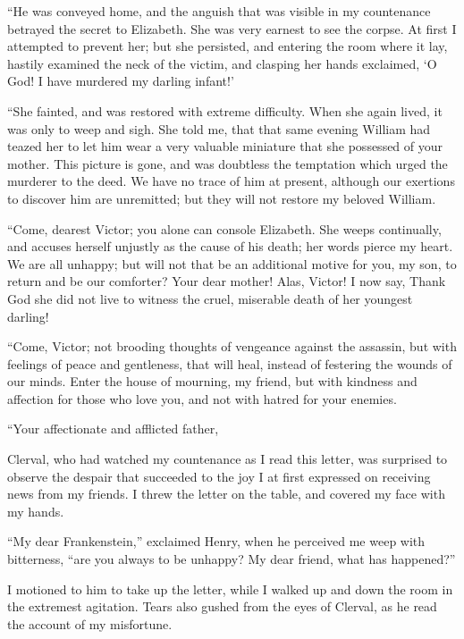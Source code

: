 ``He was conveyed home, and the
anguish that was visible in my countenance
betrayed the secret to Elizabeth.
She was very earnest to see the corpse.
At first I attempted to prevent her; but
she persisted, and entering the room
where it lay, hastily examined the neck
of the victim, and clasping her hands
exclaimed, `O God! I have murdered
my darling infant!'

``She fainted, and was restored with
extreme difficulty. When she again
lived, it was only to weep and sigh.
She told me, that that same evening
William had teazed her to let him wear
a very valuable miniature that she possessed
of your mother. This picture is
gone, and was doubtless the temptation
which urged the murderer to the deed.
We have no trace of him at present,
although our exertions to discover him
are unremitted; but they will not restore
my beloved William.

``Come, dearest Victor; you alone
can console Elizabeth. She weeps continually,
and accuses herself unjustly as
the cause of his death; her words pierce
my heart. We are all unhappy; but
will not that be an additional motive
for you, my son, to return and be our
comforter? Your dear mother! Alas,
Victor! I now say, Thank God she did
not live to witness the cruel, miserable
death of her youngest darling!

``Come, Victor; not brooding thoughts
of veng\-eance ag\-ainst the assassin, but
with feelings of peace and gentleness,
that will heal, instead of festering the
wounds of our minds. Enter the house
of mourning, my friend, but with kindness
and affection for those who love
you, and not with hatred for your enemies.

``Your affectionate and afflicted father,

Clerval, who had watched my countenance
as I read this letter, was surprised
to observe the despair that succeeded
to the joy I at first expressed
on receiving news from my friends. I
threw the letter on the table, and covered
my face with my hands.

``My dear Frankenstein,'' exclaimed
Henry, when he perceived me weep
with bitterness, ``are you always to be
unhappy? My dear friend, what has
happened?''

I motioned to him to take up the
letter, while I walked up and down the
room in the extremest agitation. Tears
also gushed from the eyes of Clerval,
as he read the account of my misfortune.

